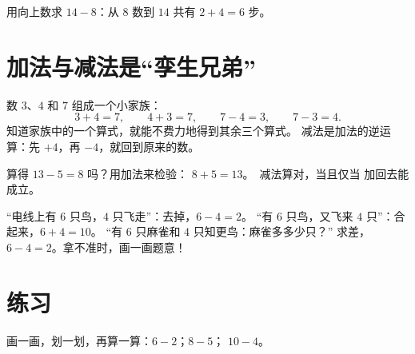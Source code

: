 \begin{omfigure}

{\small 用向上数求 $14 - 8$：从 $8$ 数到 $14$ 共有
$2 + 4 = 6$ 步。}
\end{omfigure}

\section{加法与减法是“孪生兄弟”}

\begin{example}[数的家族]\label{ex:g1:subtraction:family}
数 $3$、$4$ 和 $7$ 组成一个小家族：
\[
3 + 4 = 7, \qquad
4 + 3 = 7, \qquad
7 - 4 = 3, \qquad
7 - 3 = 4 .
\]
知道家族中的一个算式，就能不费力地得到其余三个算式。
减法是加法的逆运算：先 $+4$，再 $-4$，就回到原来的数。
\end{example}

\begin{example}[检验]\label{ex:g1:subtraction:check}
算得 $13 - 5 = 8$ 吗？用加法来检验：
$8 + 5 = 13$。\checkmark\ 减法算对，当且仅当
加回去能成立。
\end{example}

\begin{example}[用哪种运算？]\label{ex:g1:subtraction:choose}
“电线上有 $6$ 只鸟，$4$ 只飞走”：去掉，$6 - 4 = 2$。
“有 $6$ 只鸟，又飞来 $4$ 只”：合起来，$6 + 4 = 10$。
“有 $6$ 只麻雀和 $4$ 只知更鸟：麻雀多多少只？”
求差，$6 - 4 = 2$。拿不准时，画一画题意！
\end{example}

\section{练习}

\begin{exercise}[$\star$]\label{exo:g1:subtraction:1}
画一画，划一划，再算一算：$6 - 2$；\quad $8 - 5$；\quad
$10 - 4$。
\end{exercise}

